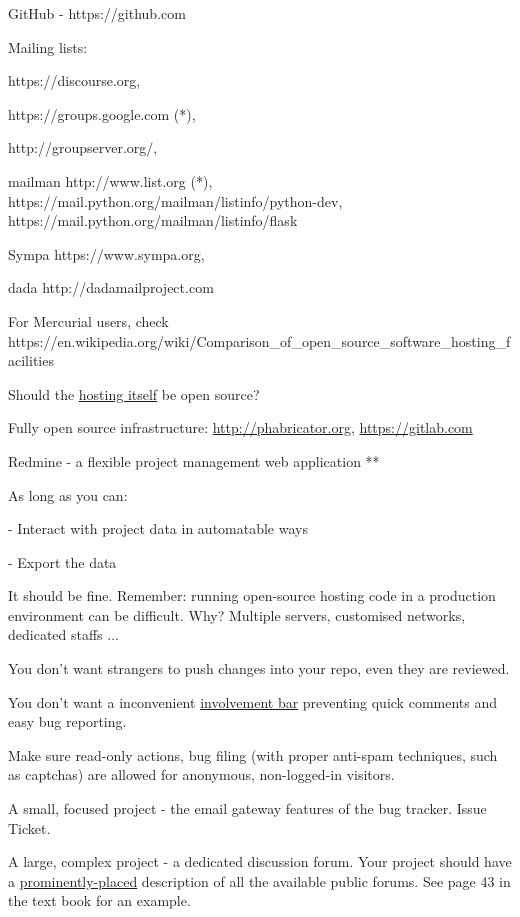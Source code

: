 \documentclass[landscape,30pt]{foils}
\begin{document}
GitHub - https://github.com

Mailing lists:

https://discourse.org,

https://groups.google.com (*),

http://groupserver.org/,

mailman http://www.list.org (*),  https://mail.python.org/mailman/listinfo/python-dev, https://mail.python.org/mailman/listinfo/flask

Sympa https://www.sympa.org,

dada http://dadamailproject.com

For Mercurial users, check https://en.wikipedia.org/wiki/Comparison\_of\_open\_source\_software\_hosting\_facilities


Should the \underline{hosting itself} be open source?

Fully open source infrastructure: \url{http://phabricator.org}, \url{https://gitlab.com}

Redmine - a flexible project management web application ** 

As long as you can:

- Interact with project data in automatable ways

- Export the data

It should be fine.  Remember: running open-source hosting code in a production environment can be difficult.  Why? Multiple servers,
customised networks, dedicated staffs ...


You don't want strangers to push changes into your repo, even they are reviewed.

You don't want a inconvenient \underline{involvement bar} preventing quick comments and easy bug reporting.

Make sure read-only actions, bug filing (with proper anti-spam techniques, such as captchas) are allowed for anonymous, non-logged-in visitors.  


A small, focused project - the email gateway features of the bug tracker. Issue Ticket.

A large, complex project - a dedicated discussion forum.  Your project should have a \underline{prominently-placed} description of all the available public forums.  See page 43 in the text book for an example.
\end{document}

